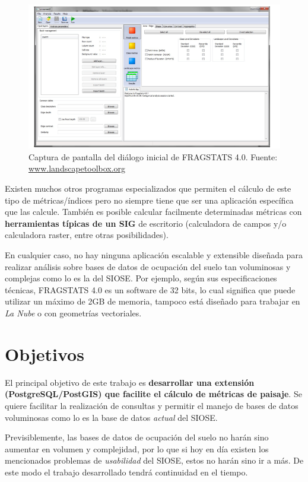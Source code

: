 \begin{figure}
\includegraphics[width=\textwidth]{Introduccion/Figs/fragstatsmodeldialog}
\caption{Captura de pantalla del diálogo inicial de FRAGSTATS 4.0\label{fig:fragstatsmodeldialog}. Fuente: \url{www.landscapetoolbox.org}}
\end{figure}


Existen muchos otros programas especializados que permiten el cálculo de este tipo de métricas/índices pero no siempre tiene que ser una aplicación específica que las calcule. También es posible calcular facilmente determinadas métricas con \textbf{herramientas típicas de un SIG} de escritorio (calculadora de campos y/o calculadora raster, entre otras posibilidades).

En cualquier caso, no hay ninguna aplicación escalable y extensible diseñada para realizar análisis sobre bases de datos de ocupación del suelo tan voluminosas y complejas como lo es la del SIOSE. Por ejemplo, según sus especificaciones técnicas, FRAGSTATS 4.0 es un software de 32 bits, lo cual significa que puede utilizar un máximo de 2GB de memoria, tampoco está diseñado para trabajar en \textit{La Nube} o con geometrías vectoriales.


\section{Objetivos}\label{sec:objetivos}

El principal objetivo de este trabajo es \textbf{desarrollar una extensión (PostgreSQL/PostGIS) que facilite el cálculo de métricas de paisaje}. Se quiere facilitar la realización de consultas y permitir el manejo de bases de datos voluminosas como lo es la base de datos \textit{actual} del SIOSE. 

Previsiblemente, las bases de datos de ocupación del suelo no harán sino aumentar en volumen y complejidad, por lo que si hoy en día existen los mencionados problemas de \textit{usabilidad} del SIOSE, estos no harán sino ir a más. De este modo el trabajo desarrollado tendrá continuidad en el tiempo.

